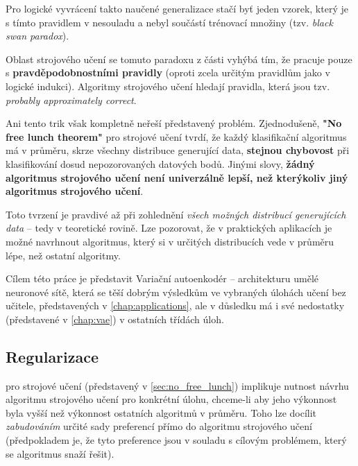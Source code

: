 Pro logické vyvrácení takto naučené generalizace stačí byť jeden vzorek, který je s tímto pravidlem v nesouladu a nebyl součástí trénovací množiny (tzv. \emph{black swan paradox}).

Oblast strojového učení se tomuto paradoxu z části vyhýbá tím, že pracuje pouze s \textbf{pravděpodobnostními pravidly} (oproti zcela určitým pravidlům jako v logické indukci).
Algoritmy strojového učení hledají pravidla, která jsou tzv. \emph{probably approximately correct}. \cite{Valiant1984}

Ani tento trik však kompletně neřeší představený problém. Zjednodušeně, \textbf{"No free lunch theorem"} pro strojové učení tvrdí, že každý klasifikační algoritmus má v průměru, skrze všechny distribuce generující data, \textbf{stejnou chybovost} při klasifikování dosud nepozorovaných datových bodů. \cite{Wolpert1996}
Jinými slovy, \textbf{žádný algoritmus strojového učení není univerzálně lepší, než kterýkoliv jiný algoritmus strojového učení}.

Toto tvrzení je pravdivé až při zohlednění \emph{všech možných distribucí generujících data} – tedy v teoretické rovině.
Lze pozorovat, že v praktických aplikacích je možné navrhnout algoritmus, který si v určitých distribucích vede v průměru lépe, než ostatní algoritmy. \cite{Goodfellow2016}

Cílem této práce je představit Variační autoenkodér – architekturu umělé neuronové sítě, která se těší dobrým výsledkům ve vybraných úlohách učení bez učitele, představených v \autoref{chap:applications}, ale v důsledku má i své nedostatky (představené v \autoref{chap:vae}) v ostatních třídách úloh.

\subsection{Regularizace}
 pro strojové učení (představený v \autoref{sec:no_free_lunch}) implikuje nutnost návrhu algoritmu strojového učení pro konkrétní úlohu, chceme-li aby jeho výkonnost byla vyšší než výkonnost ostatních algoritmů v průměru.
Toho lze docílit \emph{zabudováním} určité sady preferencí přímo do algoritmu strojového učení (předpokladem je, že tyto preference jsou v souladu s cílovým problémem, který se algoritmus snaží řešit). \cite{Goodfellow2016}

